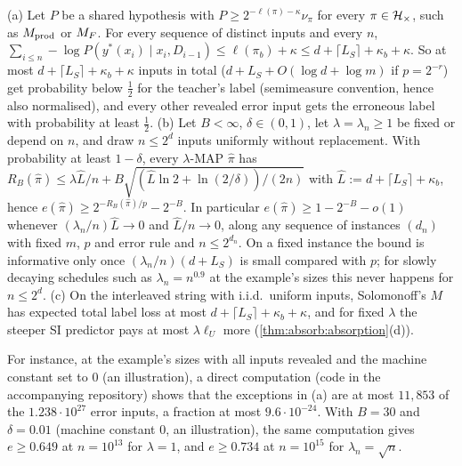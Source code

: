 \begin{proposition}\label{prop:limits:plain}\label{app:limits:plain}
(a) Let $P$ be a shared hypothesis with $P\ge2^{-\ell(\pi)-\kappa}\nu_\pi$ for every $\pi\in\mathcal{H}_{\times}$, such as $M_{\mathrm{prod}}$ or $M_{F}$. For every sequence of distinct inputs and every $n$, $\sum_{i\le n}-\log P(y^*(x_i)\mid x_i,D_{i-1})\le\ell(\pi_b)+\kappa\le d+\lceil L_S\rceil+\kappa_b+\kappa$. So at most $d+\lceil L_S\rceil+\kappa_b+\kappa$ inputs in total ($d+L_S+O(\log d+\log m)$ if $p=2^{-r}$) get probability below $\frac12$ for the teacher's label (semimeasure convention, hence also normalised), and every other revealed error input gets the erroneous label with probability at least $\frac12$.
(b) Let $B<\infty$, $\delta\in(0,1)$, let $\lambda=\lambda_n\ge1$ be fixed or depend on $n$, and draw $n\le2^d$ inputs uniformly without replacement. With probability at least $1-\delta$, every $\lambda$-MAP $\hat\pi$ has $R_B(\hat\pi)\le\lambda\hat L/n+B\sqrt{(\hat L\ln2+\ln(2/\delta))/(2n)}$ with $\hat L:=d+\lceil L_S\rceil+\kappa_b$, hence $e(\hat\pi)\ge2^{-R_B(\hat\pi)/p}-2^{-B}$. In particular $e(\hat\pi)\ge1-2^{-B}-o(1)$ whenever $(\lambda_n/n)\hat L\to0$ and $\hat L/n\to0$, along any sequence of instances $(d_n)$ with fixed $m$, $p$ and error rule and $n\le2^{d_n}$. On a fixed instance the bound is informative only once $(\lambda_n/n)(d+L_S)$ is small compared with $p$; for slowly decaying schedules such as $\lambda_n=n^{0.9}$ at the example's sizes this never happens for $n\le2^d$.
(c) On the interleaved string with i.i.d.\ uniform inputs, Solomonoff's $M$ has expected total label loss at most $d+\lceil L_S\rceil+\kappa_b+\kappa$, and for fixed $\lambda$ the steeper SI predictor pays at most $\lambda\ell_U$ more (\cref{thm:absorb:absorption}(d)).
\end{proposition}

For instance, at the example's sizes with all inputs revealed and the machine constant set to $0$ (an illustration), a direct computation (code in the accompanying repository) shows that the exceptions in (a) are at most $11{,}853$ of the $1.238\cdot10^{27}$ error inputs, a fraction at most $9.6\cdot10^{-24}$. With $B=30$ and $\delta=0.01$ (machine constant $0$, an illustration), the same computation gives $e\ge0.649$ at $n=10^{13}$ for $\lambda=1$, and $e\ge0.734$ at $n=10^{15}$ for $\lambda_n=\sqrt n$.

